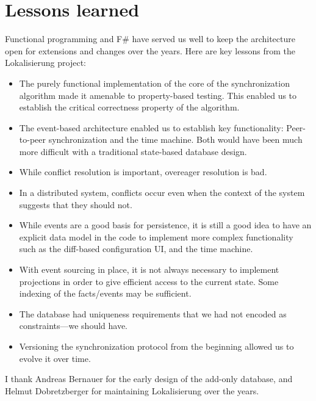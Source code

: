 \documentclass[sigplan,review]{acmart}
\begin{document}

\section{Lessons learned}
\label{sec:lessons-learned}

Functional programming and F\# have served us well to keep the
architecture open for extensions and changes over the years.  Here are
key lessons from the Lokalisierung project:
%
\begin{itemize}
\item The purely functional implementation of the core
  of the synchronization algorithm made it amenable to property-based
  testing.  This enabled us to establish the critical correctness
  property of the algorithm.
\item The event-based architecture enabled us to establish key
  functionality: Peer-to-peer synchronization and the time machine.
  Both would have been much more difficult with a traditional
  state-based database design.
\item While conflict resolution is important, overeager resolution is bad.
\item In a distributed system, conflicts occur even when the context
  of the system suggests that they should not.
\item While events are a good basis for persistence, it is still a
  good idea to have an explicit data model in the code to
  implement more complex functionality such as the diff-based
  configuration UI, and the time machine.
\item With event sourcing in place, it is not always necessary to
  implement projections in order to give efficient access to the
  current state.  Some indexing of the facts/events may be sufficient.
\item The database had uniqueness requirements that we had not
  encoded as constraints---we should have.
\item Versioning the synchronization protocol from the beginning
  allowed us to evolve it over time. 
\end{itemize}

\begin{acks}
  I thank Andreas Bernauer for the early design of the add-only
  database, and Helmut Dobretzberger for maintaining Lokalisierung
  over the years.
\end{acks}



\end{document}
